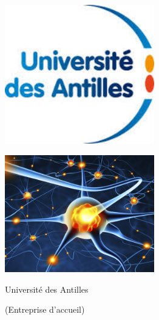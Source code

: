 \begin{titlepage}
    \enlargethispage{2cm}

    \begin{center}
        \vspace*{1cm}
        \includegraphics[width=6.5cm]{./images/logoUA.jpg}
        \vspace*{0.5cm}

        \textsc{\@title}
        \HRule
        \vspace*{0.5cm}

        \large{\@author}
    \end{center}

    \begin{center}
      \vspace*{2cm}
      \includegraphics[width=6.5cm]{./images/n_a.jpg}
    \end{center}

    \vspace*{2cm}

    \begin{center}
        Université des Antilles

        (Entreprise d'accueil)
    \end{center}

\end{titlepage}
\ClearShipoutPicture
